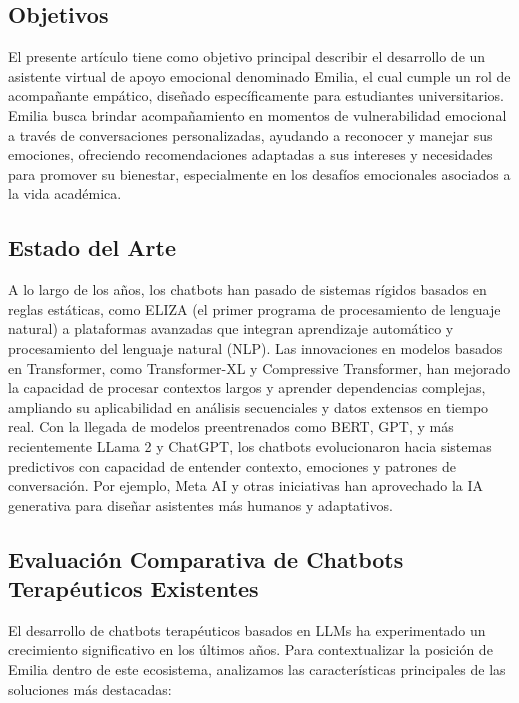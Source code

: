 \documentclass[conference]{IEEEtran}
\begin{document}
\subsection{Objetivos}
El presente artículo tiene como objetivo principal describir el desarrollo de un asistente virtual de apoyo emocional denominado Emilia, el cual cumple un rol de acompañante empático, diseñado específicamente para estudiantes universitarios. Emilia busca brindar acompañamiento en momentos de vulnerabilidad emocional a través de conversaciones personalizadas, ayudando a reconocer y manejar sus emociones, ofreciendo recomendaciones adaptadas a sus intereses y necesidades para promover su bienestar, especialmente en los desafíos emocionales asociados a la vida académica.

\subsection{Estado del Arte}
A lo largo de los años, los chatbots han pasado de sistemas rígidos basados en reglas estáticas, como ELIZA (el primer programa de procesamiento de lenguaje natural) a plataformas avanzadas que integran aprendizaje automático y procesamiento del lenguaje natural (NLP).
Las innovaciones en modelos basados en Transformer, como Transformer-XL y Compressive Transformer, han mejorado la capacidad de procesar contextos largos y aprender dependencias complejas, ampliando su aplicabilidad en análisis secuenciales y datos extensos en tiempo real. 
Con la llegada de modelos preentrenados como BERT, GPT, y más recientemente LLama 2 y ChatGPT, los chatbots evolucionaron hacia sistemas predictivos con capacidad de entender contexto, emociones y patrones de conversación. Por ejemplo, Meta AI y otras iniciativas han aprovechado la IA generativa para diseñar asistentes más humanos y adaptativos.

\subsection{Evaluación Comparativa de Chatbots Terapéuticos Existentes}
El desarrollo de chatbots terapéuticos basados en LLMs ha experimentado un crecimiento significativo en los últimos años. Para contextualizar la posición de Emilia dentro de este ecosistema, analizamos las características principales de las soluciones más destacadas:
\end{document}
